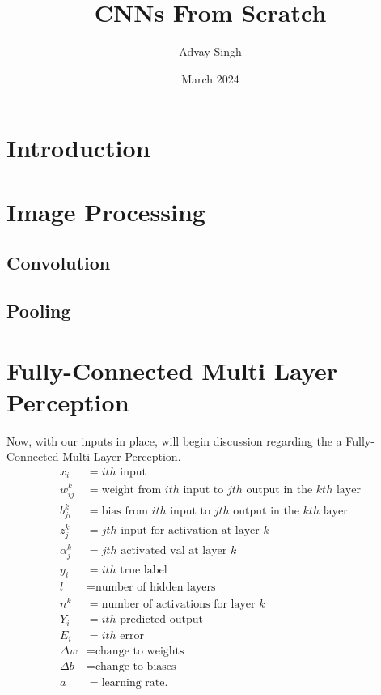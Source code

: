 \documentclass[11pt,letterpaper]{amsbook}
\title{CNNs From Scratch}
\author{Advay Singh}
\date{March 2024}
\theoremstyle{definition}
\numberwithin{definition}{chapter}
\numberwithin{exercise}{chapter}
\numberwithin{section}{chapter}
\begin{document}
\maketitle
\tableofcontents


\section{Introduction}

\section{Image Processing}

\subsection{Convolution}

\subsection{Pooling}

\section{Fully-Connected Multi Layer Perception}
Now, with our inputs in place, will begin discussion regarding the a Fully-Connected Multi Layer Perception. \\
\begin{align}
    x_i &= \text{$ith$ input} \\
    w^{k}_{ij} &= \text{weight from $ith$ input to $jth$ output in the $kth$ layer} \\
    b^{k}_{ji} &= \text{bias from $ith$ input to $jth$ output in the $kth$ layer} \\
    z^k_j &= \text{$jth$ input for activation at layer $k$} \\
    \alpha^k_j &= \text{$jth$ activated val at layer $k$} \\
    y_i &= \text{$ith$ true label} \\
    l &= \text{number of hidden layers} \\
    n^k &= \text{number of activations for layer $k$} \\
    Y_i &= \text{$ith$ predicted output} \\
    E_i &= \text{$ith$ error} \\
    \Delta w &= \text{change to weights} \\
    \Delta b &= \text{change to biases} \\
    a &= \text{learning rate}.
\end{align}
\end{document}
